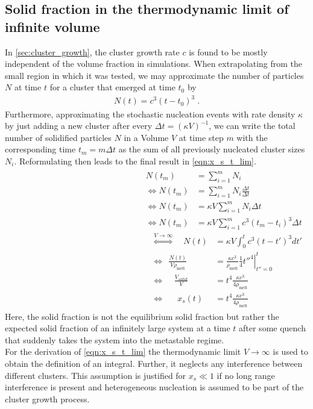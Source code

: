 \subsection{Solid fraction in the thermodynamic limit of infinite volume}
\label{sec:inf_vol_limit_nuc_rate}
In \autoref{sec:cluster_growth}, the cluster growth rate $c$ is found to be mostly independent of the volume fraction in simulations. When extrapolating from the small region in which it was tested, we may approximate the number of particles $N$ at time $t$ for a cluster that emerged at time $t_0$ by
\begin{align}
\label{eqn:simple_growth}
N(t) = c^3 (t-t_0)^3 \; \text{.}
\end{align} 
Furthermore, approximating the stochastic nucleation events with rate density $\kappa$ by just adding a new cluster after every $\Delta t = (\kappa V)^{-1}$, we can write the total number of solidified particles $N$ in a Volume $V$ at time step $m$ with the corresponding time $t_m = m \Delta t$ as the sum of all previously nucleated cluster sizes $N_i$. Reformulating then leads to the final result in \autoref{eqn:x_s_t_lim}.
\begin{align}
\begin{split}
N(t_m)&=\sum_{i=1}^m N_i\\
\Leftrightarrow N(t_m)&=\sum_{i=1}^m N_i \frac{\Delta t}{\Delta t}\\
\Leftrightarrow N(t_m)&=\kappa V \sum_{i=1}^m N_i \Delta t\\
\Leftrightarrow N(t_m)&=\kappa V \sum_{i=1}^m c^3 (t_m-t_i)^3 \Delta t
\end{split}
\begin{split}
\label{eqn:x_s_t_lim}
\stackrel{V \rightarrow \infty } {\Leftrightarrow} \quad N(t)&=\kappa V \int_0^{t} c^3 (t - t')^3 d t'\\
\Leftrightarrow \; \, \frac{N(t)}{V \rho_{\text{melt}}}&=\frac{\kappa c^3}{\rho_{\text{melt}}} \left. \frac{1}{4}t''^4 \right|_{t''=0}^t\\
\Leftrightarrow \; \; \; \; \frac{V_{solid}}{V} &= t^4 \frac{\kappa c^3}{4 \rho_{\text{melt}}}\\
\Leftrightarrow \quad \; \: x_s(t)&= t^4 \frac{\kappa c^3}{4 \rho_{\text{melt}}}
\end{split}
\end{align}
Here, the solid fraction is not the equilibrium solid fraction but rather the expected solid fraction of an infinitely large system at a time $t$ after some quench that suddenly takes the system into the metastable regime.\\ 
For the derivation of \autoref{eqn:x_s_t_lim} the thermodynamic limit $V\rightarrow \infty$ is used to obtain the definition of an integral. Further, it neglects any interference between different clusters. This assumption is justified for $x_s \ll 1$ if no long range interference is present and heterogeneous nucleation is assumed to be part of the cluster growth process.\\

